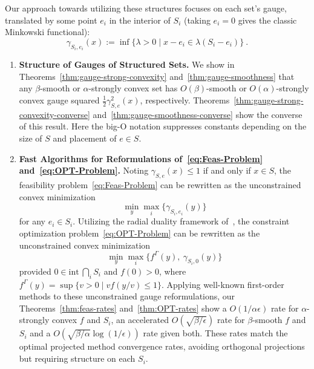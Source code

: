 \documentclass[sn-mathphys,Numbered]{sn-jnl}%
\begin{document}
Our approach towards utilizing these structures focuses on each set's gauge, translated by some point $e_i$ in the interior of $S_i$ (taking $e_i=0$ gives the classic Minkowski functional):
\begin{equation} \label{eq:gauge}
    \gamma_{S_i,e_i}(x) := \inf \{\lambda>0 \mid x-e_i \in \lambda (S_i-e_i)\}\ .
\end{equation}
\begin{enumerate}
    \item {\bf Structure of Gauges of Structured Sets.} We show in Theorems~\ref{thm:gauge-strong-convexity} and~\ref{thm:gauge-smoothness} that any $\beta$-smooth or $\alpha$-strongly convex set has $O(\beta)$-smooth or $O(\alpha)$-strongly convex gauge squared $\frac{1}{2}\gamma^2_{S,e}(x)$, respectively. Theorems~\ref{thm:gauge-strong-convexity-converse} and~\ref{thm:gauge-smoothness-converse} show the converse of this result. Here the big-O notation suppresses constants depending on the size of $S$ and placement of $e\in S$.
    \item {\bf Fast Algorithms for Reformulations of~\eqref{eq:Feas-Problem} and~\eqref{eq:OPT-Problem}.} Noting $\gamma_{S,e}(x)\leq 1$ if and only if $x\in S$, the feasibility problem~\eqref{eq:Feas-Problem} can be rewritten as the unconstrained convex minimization
    \begin{equation}\label{eq:Feas-Gauge-Problem}
        \min_y \max_i\{\gamma_{S_i,e_i}(y)\}
    \end{equation}
    for any $e_i\in S_i$. Utilizing the radial duality framework of~\cite{grimmer2023radial1, grimmer2023radial2}, the constraint optimization problem~\eqref{eq:OPT-Problem} can be rewritten as the unconstrained convex minimization
    \begin{equation}\label{eq:OPT-Gauge-Problem}
        \min_y \max_i\{f^\Gamma(y),\  \gamma_{S_i,0}(y)\}
    \end{equation}
    provided $0\in \mathrm{int\ } \bigcap_i S_i$ and $f(0)>0$, where $f^\Gamma(y)=\sup \{v>0 \mid vf(y/v) \leq 1 \} $. Applying well-known first-order methods to these unconstrained gauge reformulations, our Theorems~\ref{thm:feas-rates} and~\ref{thm:OPT-rates} show a $O(1/\alpha\epsilon)$ rate for $\alpha$-strongly convex $f$ and $S_i$, an accelerated $O(\sqrt{\beta/\epsilon})$ rate for $\beta$-smooth $f$ and $S_i$ and a $O(\sqrt{\beta/\alpha}\log(1/\epsilon))$ rate given both. These rates match the optimal projected method convergence rates, avoiding orthogonal projections but requiring structure on each $S_i$.

\end{enumerate}
\end{document}
